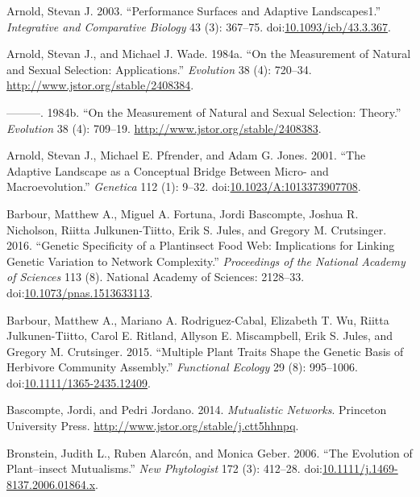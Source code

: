 \documentclass[11pt,]{article}
\begin{document}
\hypertarget{ref-Arnold2003}{}
Arnold, Stevan J. 2003. ``Performance Surfaces and Adaptive
Landscapes1.'' \emph{Integrative and Comparative Biology} 43 (3):
367--75.
doi:\href{https://doi.org/10.1093/icb/43.3.367}{10.1093/icb/43.3.367}.

\hypertarget{ref-Arnold1984applications}{}
Arnold, Stevan J., and Michael J. Wade. 1984a. ``On the Measurement of
Natural and Sexual Selection: Applications.'' \emph{Evolution} 38 (4):
720--34. \url{http://www.jstor.org/stable/2408384}.

\hypertarget{ref-Arnold1984theory}{}
---------. 1984b. ``On the Measurement of Natural and Sexual Selection:
Theory.'' \emph{Evolution} 38 (4): 709--19.
\url{http://www.jstor.org/stable/2408383}.

\hypertarget{ref-Arnold2001}{}
Arnold, Stevan J., Michael E. Pfrender, and Adam G. Jones. 2001. ``The
Adaptive Landscape as a Conceptual Bridge Between Micro- and
Macroevolution.'' \emph{Genetica} 112 (1): 9--32.
doi:\href{https://doi.org/10.1023/A:1013373907708}{10.1023/A:1013373907708}.

\hypertarget{ref-Barbour2016}{}
Barbour, Matthew A., Miguel A. Fortuna, Jordi Bascompte, Joshua R.
Nicholson, Riitta Julkunen-Tiitto, Erik S. Jules, and Gregory M.
Crutsinger. 2016. ``Genetic Specificity of a Plantinsect Food Web:
Implications for Linking Genetic Variation to Network Complexity.''
\emph{Proceedings of the National Academy of Sciences} 113 (8). National
Academy of Sciences: 2128--33.
doi:\href{https://doi.org/10.1073/pnas.1513633113}{10.1073/pnas.1513633113}.

\hypertarget{ref-Barbour2015}{}
Barbour, Matthew A., Mariano A. Rodriguez-Cabal, Elizabeth T. Wu, Riitta
Julkunen-Tiitto, Carol E. Ritland, Allyson E. Miscampbell, Erik S.
Jules, and Gregory M. Crutsinger. 2015. ``Multiple Plant Traits Shape
the Genetic Basis of Herbivore Community Assembly.'' \emph{Functional
Ecology} 29 (8): 995--1006.
doi:\href{https://doi.org/10.1111/1365-2435.12409}{10.1111/1365-2435.12409}.

\hypertarget{ref-Bascompte2014}{}
Bascompte, Jordi, and Pedri Jordano. 2014. \emph{Mutualistic Networks}.
Princeton University Press.
\url{http://www.jstor.org/stable/j.ctt5hhnpq}.

\hypertarget{ref-Bronstein2006}{}
Bronstein, Judith L., Ruben Alarcón, and Monica Geber. 2006. ``The
Evolution of Plant--insect Mutualisms.'' \emph{New Phytologist} 172 (3):
412--28.
doi:\href{https://doi.org/10.1111/j.1469-8137.2006.01864.x}{10.1111/j.1469-8137.2006.01864.x}.
\end{document}
